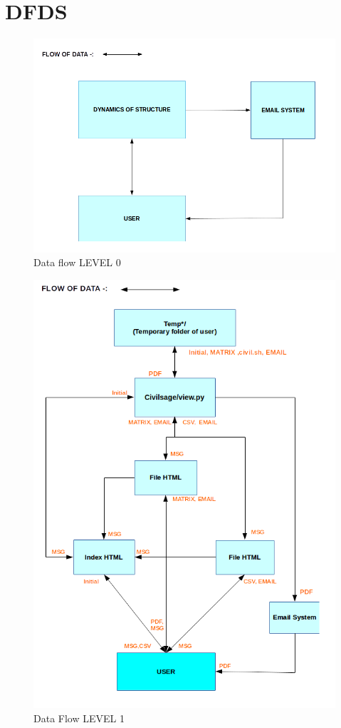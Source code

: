 \section{DFDS}
\begin{figure}[H]
\centering \includegraphics[scale=0.4]{images/DFDS.png}
\caption{Data flow LEVEL 0}
\end{figure}
\begin{figure}[H]
\centering \includegraphics[scale=0.55]{images/DFDS1.png}
\caption{Data Flow LEVEL 1}
\end{figure}
